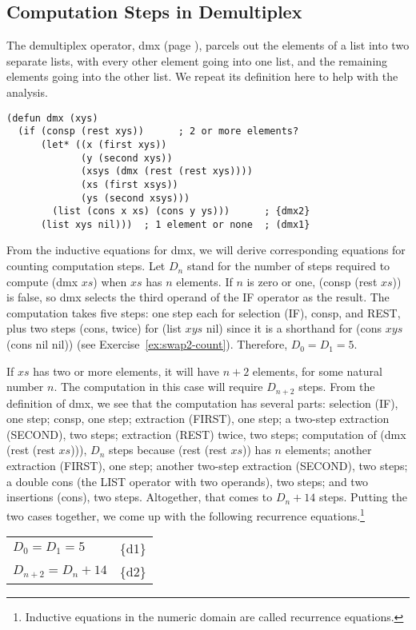 \subsection{Computation Steps in Demultiplex}
\label{subsec:dmx-steps}

The demultiplex operator, dmx (page \pageref{dmx-defun}), parcels out the elements of a list
into two separate lists, with every other element going into one list,
and the remaining elements going into the other list.
We repeat its definition here to help with the analysis.

\label{defun:dmx-copy}
\begin{Verbatim}
(defun dmx (xys)
  (if (consp (rest xys))      ; 2 or more elements?
      (let* ((x (first xys))
             (y (second xys))
             (xsys (dmx (rest (rest xys))))
             (xs (first xsys))
             (ys (second xsys)))
        (list (cons x xs) (cons y ys)))      ; {dmx2}
      (list xys nil)))  ; 1 element or none  ; (dmx1}
\end{Verbatim}

From the inductive equations for dmx,
we will derive corresponding equations for counting computation steps.
Let $D_n$ stand for the number of steps required
to compute (dmx $xs$) when $xs$ has $n$ elements.
If $n$ is zero or one, (consp (rest $xs$)) is false,
so dmx selects the third operand of the IF operator as the result.
The computation takes five steps: one step each for selection (IF),
consp, and REST, plus two steps (cons, twice) for (list $xys$ nil)
since it is a shorthand for (cons $xys$ (cons nil nil))
(see Exercise~\ref{ex:swap2-count}).
Therefore, $D_0 = D_1 = 5$.

If $xs$ has two or more elements, it will have $n+2$ elements,
for some natural number $n$.
The computation in this case will require $D_{n+2}$ steps.
From the definition of dmx, we see that the computation
has several parts:
selection (IF), one step;
consp, one step;
extraction (FIRST), one step;
a two-step extraction (SECOND), two steps;
extraction (REST) twice, two steps;
computation of (dmx (rest (rest $xs$))),
$D_n$ steps because (rest (rest $xs$)) has $n$ elements;
another extraction (FIRST), one step;
another two-step extraction (SECOND), two steps;
a double cons (the LIST operator with two operands), two steps; and
two insertions (cons), two steps.
Altogether, that comes to $D_n + 14$ steps.
Putting the two cases together,
we come up with the following recurrence equations.\footnote{Inductive
equations in the numeric domain are called
\label{def:recurrence-equations} recurrence equations.}
\begin{center}
\begin{tabular}{ll}
  $D_0 = D_1 = 5$      & \{d1\} \\
  $D_{n+2} = D_n + 14$ & \{d2\} \\
\end{tabular}
\end{center}


